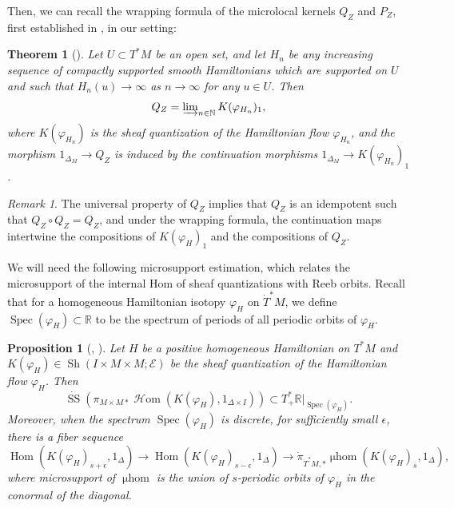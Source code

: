 \documentclass[11pt]{amsart}
\numberwithin{equation}{section}
\theoremstyle{plain}
\newtheorem{Thm}{Theorem}[section]
\newtheorem{Prop}[prop]{Proposition}
\theoremstyle{definition}
\theoremstyle{remark}
\newtheorem{RMK}[rmk]{Remark}
\newcommand{\bR} { {\mathbb{R}}}
\newcommand{\bN} { {\mathbb{N}}}
\newcommand{\cE} { {\mathcal{E}}}
\newcommand{\Sh} { {\operatorname{Sh}}}
\newcommand\Hom{\operatorname{Hom}}
\newcommand\mhom{\operatorname{\mu hom}}
\newcommand\ms{\operatorname{SS}}
\newcommand\sHom{\operatorname{\mathscr{H}om}}
\newcommand\Spec{\operatorname{Spec}}
\begin{document}
Then, we can recall the wrapping formula of the microlocal kernels $Q_Z$ and $P_Z$, first established in \cite[Theorem 1.2]{kuo2021wrapped}, in our setting:

\begin{Thm}[{\cite[Theorem 1.2]{kuo2021wrapped}}]\label{thm:wrapping}
Let $U \subset T^*M$ be an open set, and let $H_n$ be any increasing sequence of compactly supported smooth Hamiltonians which are supported on $U$ and such that $H_n(u) \to \infty$ as $n \to \infty$ for any $u \in U$. Then
\begin{equation}
    Q_Z = \varinjlim\nolimits_{n\in \bN}K(\varphi_{H_n})_1,
\end{equation}
where $K(\varphi_{H_n})$ is the sheaf quantization of the Hamiltonian flow $\varphi_{H_n}$, and the morphism $1_{\Delta_M} \to Q_Z$ is induced by the continuation morphisms $1_{\Delta_M} \to K(\varphi_{H_n})_1$.
\end{Thm}
\begin{RMK}\label{rmk: idempotence}
The universal property of $Q_Z$ implies that $Q_Z$ is an idempotent such that $Q_Z \circ Q_Z = Q_Z$, and under the wrapping formula, the continuation maps intertwine the compositions of $K(\varphi_H)_1$ and the compositions of $Q_Z$.
\end{RMK}

We will need the following microsupport estimation, which relates the microsupport of the internal Hom of sheaf quantizations with Reeb orbits. Recall that for a homogeneous Hamiltonian isotopy $\varphi_H$ on $\dot T^*M$, we define $\Spec(\varphi_H) \subset \bR$ to be the spectrum of periods of all periodic orbits of $\varphi_H$.

\begin{Prop}[{\cite[Section 4.3]{Ike_2019}, \cite[Theorem 4.3]{Kuo-Li-Duality}}]\label{prop:microsupport orbit}
Let $H$ be a positive homogeneous Hamiltonian on $T^*M$ and $K(\varphi_H) \in \Sh(I \times M \times M; \cE)$ be the sheaf quantization of the Hamiltonian flow $\varphi_H$. Then
\[\dot{\ms}(\pi_{M\times M*}\sHom(K(\varphi_H), 1_{\Delta \times I})) \subset T^*_+\bR|_{\Spec(\varphi_H)}.\]
Moreover, when the spectrum $\Spec(\varphi_H)$ is discrete, for sufficiently small $\epsilon$, there is a fiber sequence
\[\Hom(K(\varphi_H)_{s+\epsilon}, 1_\Delta) \to \Hom(K(\varphi_H)_{s-\epsilon}, 1_\Delta) \to \dot{\pi}_{\dot T^*M,*}\mhom(K(\varphi_H)_s, 1_\Delta),\]
where microsupport of $\mhom$ is the union of $s$-periodic orbits of $\varphi_H$ in the conormal of the diagonal.
\end{Prop}
\end{document}
